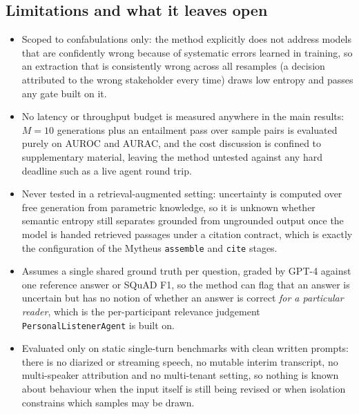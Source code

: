 \subsection{Limitations and what it leaves open}
\begin{itemize}[leftmargin=*, itemsep=1pt, topsep=2pt]
  \item Scoped to confabulations only: the method explicitly does not address models that are confidently wrong because of systematic errors learned in training, so an extraction that is consistently wrong across all resamples (a decision attributed to the wrong stakeholder every time) draws low entropy and passes any gate built on it.
  \item No latency or throughput budget is measured anywhere in the main results: $M{=}10$ generations plus an entailment pass over sample pairs is evaluated purely on AUROC and AURAC, and the cost discussion is confined to supplementary material, leaving the method untested against any hard deadline such as a live agent round trip.
  \item Never tested in a retrieval-augmented setting: uncertainty is computed over free generation from parametric knowledge, so it is unknown whether semantic entropy still separates grounded from ungrounded output once the model is handed retrieved passages under a citation contract, which is exactly the configuration of the Mytheus \texttt{assemble} and \texttt{cite} stages.
  \item Assumes a single shared ground truth per question, graded by GPT-4 against one reference answer or SQuAD F1, so the method can flag that an answer is uncertain but has no notion of whether an answer is correct \emph{for a particular reader}, which is the per-participant relevance judgement \texttt{PersonalListenerAgent} is built on.
  \item Evaluated only on static single-turn benchmarks with clean written prompts: there is no diarized or streaming speech, no mutable interim transcript, no multi-speaker attribution and no multi-tenant setting, so nothing is known about behaviour when the input itself is still being revised or when isolation constrains which samples may be drawn.
\end{itemize}
